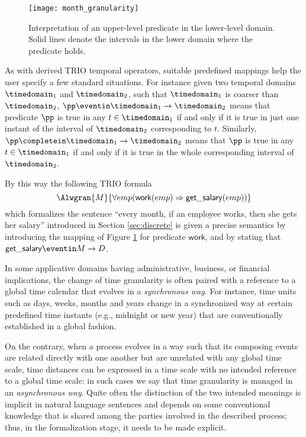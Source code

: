 \begin{figure}[htb!]
	 \centering
	 \texttt{[image: month\_granularity]}
	 \caption{Interpretation of an upper-level predicate in the lower-level domain. Solid lines denote the intervals in the lower domain where the predicate holds.}
	 \label{fig:granularity}
\end{figure}


As with derived TRIO temporal operators, suitable predefined mappings
help the user specify a few standard situations. For instance given
two temporal domains $\timedomain_1$ and $\timedomain_2$, such that
$\timedomain_1$ is coarser than $\timedomain_2$, $\pp \eventin
\timedomain_1 \rightarrow \timedomain_2$ means that predicate $\pp$ is
true in any $t \in \timedomain_1$ if and only if it is true in just
one instant of the interval of $\timedomain_2$ corresponding to
$t$. Similarly, $\pp \completein \timedomain_1 \rightarrow
\timedomain_2$ means that $\pp$ is true in any $t \in \timedomain_1$ if and only if
it is true in the whole corresponding interval of $\timedomain_2$.

By this way the following TRIO formula
\begin{equation*}
\Alwgran{M}{\forall emp (\mathsf{work}(emp) \Rightarrow \mathsf{get\_salary}(emp))}
\end{equation*}
which formalizes the sentence ``every month, if an employee works,
then she gets her salary'' introduced in Section \ref{sec:discrete} is
given a precise semantics by introducing the mapping of Figure
\ref{fig:granularity} for predicate $\mathsf{work}$, and by stating
that $\mathsf{get\_salary} \eventin M \rightarrow D$.

In some applicative domains having administrative, business, or
financial implications, the change of time granularity is often paired
with a reference to a global time calendar that evolves in a
\emph{synchronous way}. For instance, time units such as days, weeks,
months and years change in a synchronized way at certain predefined
time instants (e.g., midnight or new year) that are conventionally
established in a global fashion.

On the contrary, when a process evolves in a way such that its
composing events are related directly with one another but are
unrelated with any global time scale, time distances can be expressed
in a time scale with no intended reference to a global time scale: in
such cases we say that time granularity is managed in an
\emph{asynchronous way}. Quite often the distinction of the two
intended meanings is implicit in natural language sentences and
depends on some conventional knowledge that is shared among the
parties involved in the described process; thus, in the formalization
stage, it needs to be made explicit.


